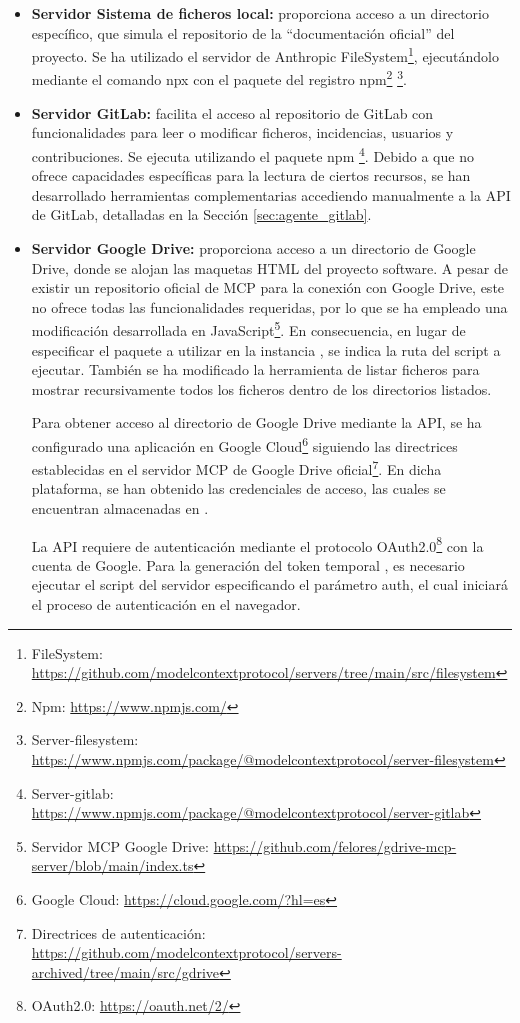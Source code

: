 \begin{itemize}
  \item\textbf{Servidor Sistema de ficheros local: }proporciona acceso a un directorio específico, que simula el repositorio de la ``documentación oficial'' del proyecto. Se ha utilizado el servidor de Anthropic FileSystem\footnote{FileSystem: \url{https://github.com/modelcontextprotocol/servers/tree/main/src/filesystem}}, ejecutándolo mediante el comando npx con el paquete del registro npm\footnote{Npm: \url{https://www.npmjs.com/}} \footnote{Server-filesystem: \url{https://www.npmjs.com/package/@modelcontextprotocol/server-filesystem}}.

  \label{sec:gitlab_mcp}
  \item\textbf{Servidor GitLab: }facilita el acceso al repositorio de GitLab con funcionalidades para leer o modificar ficheros, incidencias, usuarios y contribuciones. Se ejecuta utilizando el paquete npm \footnote{Server-gitlab: \url{https://www.npmjs.com/package/@modelcontextprotocol/server-gitlab}}. Debido a que no ofrece capacidades específicas para la lectura de ciertos recursos, se han desarrollado herramientas complementarias accediendo manualmente a la API de GitLab, detalladas en la Sección \ref{sec:agente_gitlab}.

\item\textbf{Servidor Google Drive: }proporciona acceso a un directorio de Google Drive, donde se alojan las maquetas HTML del proyecto software. A pesar de existir un repositorio oficial de MCP para la conexión con Google Drive, este no ofrece todas las funcionalidades requeridas, por lo que se ha empleado una modificación desarrollada en JavaScript\footnote{Servidor MCP Google Drive: \url{https://github.com/felores/gdrive-mcp-server/blob/main/index.ts}}. En consecuencia, en lugar de especificar el paquete a utilizar en la instancia , se indica la ruta del script a ejecutar. También se ha modificado la herramienta de listar ficheros para mostrar recursivamente todos los ficheros dentro de los directorios listados.

Para obtener acceso al directorio de Google Drive mediante la API, se ha configurado una aplicación en Google Cloud\footnote{Google Cloud: \url{https://cloud.google.com/?hl=es}} siguiendo las directrices establecidas en el servidor MCP de Google Drive oficial\footnote{Directrices de autenticación: \url{https://github.com/modelcontextprotocol/servers-archived/tree/main/src/gdrive}}. En dicha plataforma, se han obtenido las credenciales de acceso, las cuales se encuentran almacenadas en .

La API requiere de autenticación mediante el protocolo OAuth2.0\footnote{OAuth2.0: \url{https://oauth.net/2/}} con la cuenta de Google. Para la generación del token temporal , es necesario ejecutar el script del servidor especificando el parámetro auth, el cual iniciará el proceso de autenticación en el navegador.

\end{itemize}

